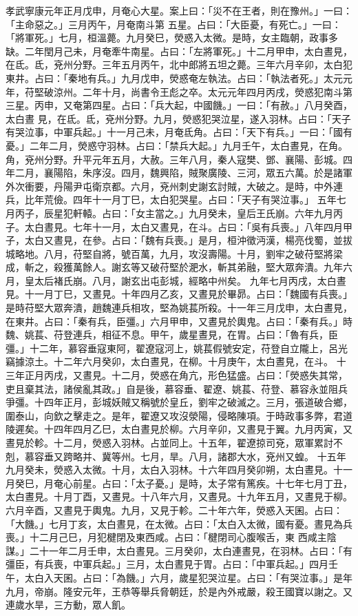 \begin{pinyinscope}
 孝武寧康元年正月戊申，月奄心大星。案上曰：「災不在王者，則在豫州。」一曰：「主命惡之。」三月丙午，月奄南斗第
 五星。占曰：「大臣憂，有死亡。」一曰：「將軍死。」七月，桓溫薨。九月癸巳，熒惑入太微。是時，女主臨朝，政事多缺。二年閏月己未，月奄牽牛南星。占曰：「左將軍死。」十二月甲申，太白晝見，在氐。氐，兗州分野。三年五月丙午，北中郎將五坦之薨。三年六月辛卯，太白犯東井。占曰：「秦地有兵。」九月戊申，熒惑奄左執法。占曰：「執法者死。」太元元年，苻堅破涼州。二年十月，尚書令王彪之卒。太元元年四月丙戌，熒惑犯南斗第三星。丙申，又奄第四星。占曰：「兵大起，中國饑。」一曰：「有赦。」八月癸酉，太白晝
 見，在氐。氐，兗州分野。九月，熒惑犯哭泣星，遂入羽林。占曰：「天子有哭泣事，中軍兵起。」十一月己未，月奄氐角。占曰：「天下有兵。」一曰：「國有憂。」二年二月，熒惑守羽林。占曰：「禁兵大起。」九月壬午，太白晝見，在角。角，兗州分野。升平元年五月，大赦。三年八月，秦人寇樊、鄧、襄陽、彭城。四年二月，襄陽陷，朱序沒。四月，魏興陷，賊聚廣陵、三河，眾五六萬。於是諸軍外次衝要，丹陽尹屯衛京都。六月，兗州刺史謝玄討賊，大破之。是時，中外連兵，比年荒儉。四年十一月丁巳，太白犯哭星。占曰：「天子有哭泣事。」
 五年七月丙子，辰星犯軒轅。占曰：「女主當之。」九月癸未，皇后王氏崩。六年九月丙子。太白晝見。七年十一月，太白又晝見，在斗。占曰：「吳有兵喪。」八年四月甲子，太白又晝見，在參。占曰：「魏有兵喪。」是月，桓沖徵沔漢，楊亮伐蜀，並拔城略地。八月，苻堅自將，號百萬，九月，攻沒壽陽。十月，劉牢之破苻堅將梁成，斬之，殺獲萬餘人。謝玄等又破苻堅於淝水，斬其弟融，堅大眾奔潰。九年六月，皇太后褚氏崩。八月，謝玄出屯彭城，經略中州矣。
 九年七月丙戌，太白晝見。十一月丁巳，又晝見。十年四月乙亥，又晝見於畢昴。占曰：「魏國有兵喪。」是時苻堅大眾奔潰，趙魏連兵相攻，堅為姚萇所殺。十一年三月戊申，太白晝見，在東井。占曰：「秦有兵，臣彊。」六月甲申，又晝見於輿鬼。占曰：「秦有兵。」時魏、姚萇、苻登連兵，相征不息。甲午，歲星晝見，在胃。占曰：「魯有兵，臣彊。」十二年，慕容垂寇東阿，翟遼寇河上，姚萇假號安定，苻登自立隴上，呂光竊據涼土。十二年六月癸卯，太白晝見，在柳。十月庚午，太白晝見，在斗。
 十三年正月丙戌，又晝見。十二月，熒惑在角亢，形色猛盛。占曰：「熒惑失其常，吏且棄其法，諸侯亂其政。」自是後，慕容垂、翟遼、姚萇、苻登、慕容永並阻兵爭彊。十四年正月，彭城妖賊又稱號於皇丘，劉牢之破滅之。三月，張道破合鄉，圍泰山，向欽之擊走之。是年，翟遼又攻沒滎陽，侵略陳項。于時政事多弊，君道陵遲矣。十四年四月乙巳，太白晝見於柳。六月辛卯，又晝見于翼。九月丙寅，又晝見於軫。十二月，熒惑入羽林。占並同上。十五年，翟遼掠司兗，眾軍累討不剋，慕容垂又跨略并、冀等州。七月，旱。八月，諸郡大水，兗州又蝗。
 十五年九月癸未，熒惑入太微。十月，太白入羽林。十六年四月癸卯朔，太白晝見。十一月癸巳，月奄心前星。占曰：「太子憂。」是時，太子常有篤疾。十七年七月丁丑，太白晝見。十月丁酉，又晝見。十八年六月，又晝見。十九年五月，又晝見于柳。六月辛酉，又晝見于輿鬼。九月，又見于軫。二十年六年，熒惑入天囷。占曰：「大饑。」七月丁亥，太白晝見，在太微。占曰：「太白入太微，國有憂。晝見為兵喪。」十二月己巳，月犯楗閉及東西咸。占曰：「楗閉司心腹喉舌，東
 西咸主陰謀。」二十一年二月壬申，太白晝見。三月癸卯，太白連晝見，在羽林。占曰：「有彊臣，有兵喪，中軍兵起。」三月，太白晝見于胃。占曰：「中軍兵起。」四月壬午，太白入天囷。占曰：「為饑。」六月，歲星犯哭泣星。占曰：「有哭泣事。」是年九月，帝崩。隆安元年，王恭等舉兵脅朝廷，於是內外戒嚴，殺王國寶以謝之。又連歲水旱，三方動，眾人飢。




\end{pinyinscope}
